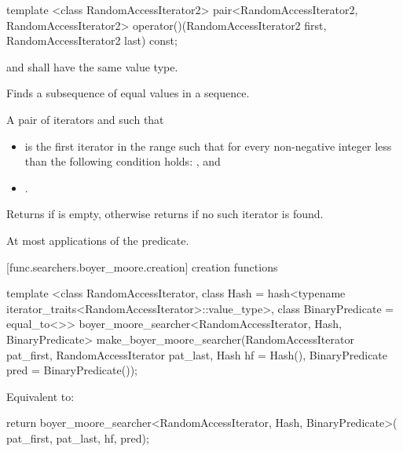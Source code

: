 %
%
\begin{itemdecl}
template <class RandomAccessIterator2>
  pair<RandomAccessIterator2, RandomAccessIterator2>
    operator()(RandomAccessIterator2 first, RandomAccessIterator2 last) const;
\end{itemdecl}

\begin{itemdescr}
\pnum
\requires
{} and  shall have the same value type.

\pnum
\effects
Finds a subsequence of equal values in a sequence.

\pnum
\returns
A pair of iterators  and  such that
\begin{itemize}
\item {} is the first iterator
in the range  such that
for every non-negative integer  less than 
the following condition holds:
, and
\item {}.
\end{itemize}
Returns  if  is empty,
otherwise returns  if no such iterator is found.

\pnum
\complexity
At most  applications of the predicate.
\end{itemdescr}

[func.searchers.boyer_moore.creation]{ creation functions}

%
\begin{itemdecl}
template <class RandomAccessIterator,
          class Hash = hash<typename iterator_traits<RandomAccessIterator>::value_type>,
          class BinaryPredicate = equal_to<>>
  boyer_moore_searcher<RandomAccessIterator, Hash, BinaryPredicate>
    make_boyer_moore_searcher(RandomAccessIterator pat_first,
                              RandomAccessIterator pat_last, Hash hf = Hash(),
                              BinaryPredicate pred = BinaryPredicate());
\end{itemdecl}

\begin{itemdescr}
\pnum
\effects
Equivalent to:
\begin{codeblock}
return boyer_moore_searcher<RandomAccessIterator, Hash, BinaryPredicate>(
         pat_first, pat_last, hf, pred);
\end{codeblock}
\end{itemdescr}

